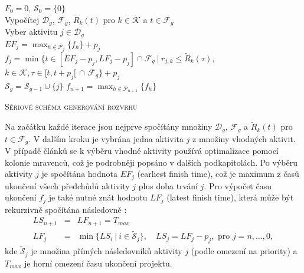 \documentclass[a4paper,12pt]{article}
\makeatletter
\newcommand{\nosemic}{\renewcommand{\@endalgocfline}{\relax}}%
\newcommand{\dosemic}{\renewcommand{\@endalgocfline}{\algocf@endline}}%
\newcommand{\pushline}{\Indp}%
\makeatother
\begin{document}
\medskip
\begin{algorithm}[H]
 \SetNlSty{}{}{:}
 \SetNlSkip{-1.2em}
 \SetInd{1em}{1em}
 \BlankLine
 \Indentp{1.7em}
    $F_0 = 0$, $\mathcal{S}_0 = \{ 0 \}$ \\
     {
      Vypočítej $\mathcal{D}_g$, $\mathcal{F}_g$, $\tilde{R}_k(t)$ pro $k\in\mathcal{K}$ a $t\in \mathcal{F}_g$ \\
      Vyber aktivitu $j\in\mathcal{D}_g$ \\
      $EF_j = \max_{h \in \mathcal{P}_j}\{ f_h \} + p_j$ \\
      \nosemic $f_j = \min\big\{ t\in [EF_j - p_j, LF_j - p_j] \cap \mathcal{F}_g\ |\ r_{j,k}\leq \tilde{R}_k(\tau),$ \;
	\pushline\dosemic $k \in\mathcal{K}, \tau\in [t,t+p_j[\,\cap\, \mathcal{F}_g \big\} + p_j$ \\
      \Indm $\mathcal{S}_g = \mathcal{S}_{g-1}\cup \{ j \}$
    }
    $f_{n+1}  = \max_{h \in \mathcal{P}_{n+1}}\{ f_h \}$
 \caption{\textsc{Sériové schéma generování rozvrhu}}
 \label{fastSlam}
\end{algorithm}

\medskip
Na začátku každé iterace jsou nejprve spočítány množiny $\mathcal{D}_g$, $\mathcal{F}_g$ a $\tilde{R}_k(t)$
pro $t \in \mathcal{F}_g$. V dalším kroku je vybrána jedna aktivita $j$ z množiny vhodných aktivit.
V případě článků \cite{Merkle00antcolony, 1027745} se k výběru vhodné aktivity používá optimalizace pomocí kolonie mravenců, což
je podrobněji popsáno v dalších podkapitolách.
Po výběru aktivity $j$ je spočítána hodnota $EF_j$ (earliest finish time), což je maximum z časů ukončení všech předchůdů 
aktivity $j$ plus doba trvání $j$. Pro výpočet času ukončení $f_j$ je také nutné znát hodnotu $LF_j$ (latest finish time),
která může být rekurzivně spočítána následovně \cite{1027745, DBLP:journals/jcp/LiuY11a}:
\begin{eqnarray*}
  LS_{n+1} &=& LF_{n+1} = T_{max}\\
  LF_j &=& \min\{LS_i\ |\ i\in\tilde{\mathcal{S}}_j\},\quad LS_j = LF_j - p_j,\mbox{ pro }j = n,\dots, 0,
\end{eqnarray*}
kde $\tilde{\mathcal{S}}_j$ je množina přímých následovníků aktivity $j$ (podle omezení na priority) a $T_{max}$ je 
horní omezení času ukončení projektu. 
\end{document}
